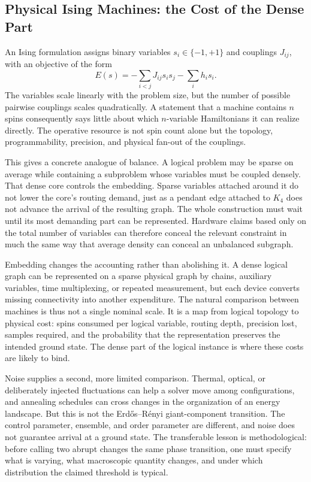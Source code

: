 \documentclass[11pt]{article}
\begin{document}
\subsection{Physical Ising Machines: the Cost of the Dense Part}

An Ising formulation assigns binary variables $s_i\in\{-1,+1\}$ and couplings $J_{ij}$, with an objective of the form
\[
E(s)=-\sum_{i<j}J_{ij}s_is_j-\sum_i h_i s_i.
\]
The variables scale linearly with the problem size, but the number of possible pairwise couplings scales quadratically. A statement that a machine contains $n$ spins consequently says little about which $n$-variable Hamiltonians it can realize directly. The operative resource is not spin count alone but the topology, programmability, precision, and physical fan-out of the couplings.

This gives a concrete analogue of balance. A logical problem may be sparse on average while containing a subproblem whose variables must be coupled densely. That dense core controls the embedding. Sparse variables attached around it do not lower the core's routing demand, just as a pendant edge attached to $K_4$ does not advance the arrival of the resulting graph. The whole construction must wait until its most demanding part can be represented. Hardware claims based only on the total number of variables can therefore conceal the relevant constraint in much the same way that average density can conceal an unbalanced subgraph.

Embedding changes the accounting rather than abolishing it. A dense logical graph can be represented on a sparse physical graph by chains, auxiliary variables, time multiplexing, or repeated measurement, but each device converts missing connectivity into another expenditure. The natural comparison between machines is thus not a single nominal scale. It is a map from logical topology to physical cost: spins consumed per logical variable, routing depth, precision lost, samples required, and the probability that the representation preserves the intended ground state. The dense part of the logical instance is where these costs are likely to bind.

Noise supplies a second, more limited comparison. Thermal, optical, or deliberately injected fluctuations can help a solver move among configurations, and annealing schedules can cross changes in the organization of an energy landscape. But this is not the Erd\H{o}s--R\'enyi giant-component transition. The control parameter, ensemble, and order parameter are different, and noise does not guarantee arrival at a ground state. The transferable lesson is methodological: before calling two abrupt changes the same phase transition, one must specify what is varying, what macroscopic quantity changes, and under which distribution the claimed threshold is typical.
\end{document}
